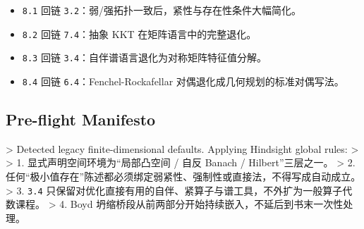         \begin{itemize}
  \item \texttt{8.1} 回链 \texttt{3.2}：弱/强拓扑一致后，紧性与存在性条件大幅简化。
  \item \texttt{8.2} 回链 \texttt{7.4}：抽象 KKT 在矩阵语言中的完整退化。
  \item \texttt{8.3} 回链 \texttt{3.4}：自伴谱语言退化为对称矩阵特征值分解。
  \item \texttt{8.4} 回链 \texttt{6.4}：Fenchel-Rockafellar 对偶退化成几何规划的标准对偶写法。
\end{itemize}

\subsection*{Pre-flight Manifesto}

> Detected legacy finite-dimensional defaults. Applying Hindsight global rules: > > 1. 显式声明空间环境为“局部凸空间 / 自反 Banach / Hilbert”三层之一。 > 2. 任何“极小值存在”陈述都必须绑定弱紧性、强制性或直接法，不得写成自动成立。 > 3. \texttt{3.4} 只保留对优化直接有用的自伴、紧算子与谱工具，不外扩为一般算子代数课程。 > 4. Boyd 坍缩桥段从前两部分开始持续嵌入，不延后到书末一次性处理。
